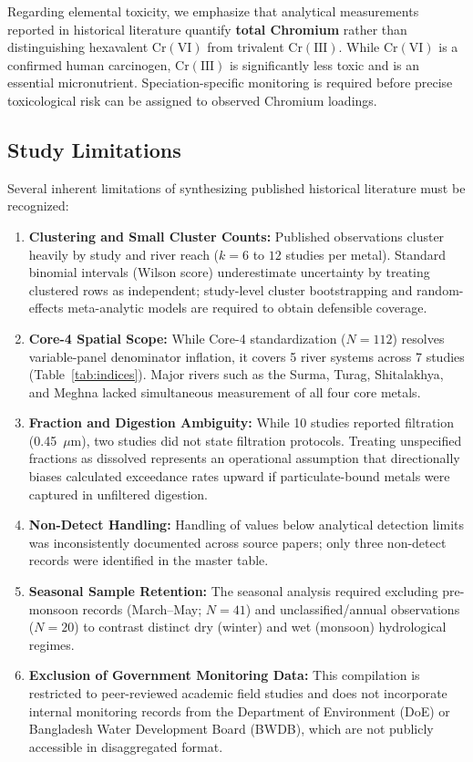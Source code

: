 \documentclass[authoryear,preprint,12pt]{elsarticle}
\begin{document}
Regarding elemental toxicity, we emphasize that analytical measurements reported in historical literature quantify \textbf{total Chromium} rather than distinguishing hexavalent $\mathrm{Cr(VI)}$ from trivalent $\mathrm{Cr(III)}$. While $\mathrm{Cr(VI)}$ is a confirmed human carcinogen, $\mathrm{Cr(III)}$ is significantly less toxic and is an essential micronutrient. Speciation-specific monitoring is required before precise toxicological risk can be assigned to observed Chromium loadings.

\subsection{Study Limitations}
Several inherent limitations of synthesizing published historical literature must be recognized:
\begin{enumerate}
    \item \textbf{Clustering and Small Cluster Counts:} Published observations cluster heavily by study and river reach ($k=6$ to $12$ studies per metal). Standard binomial intervals (Wilson score) underestimate uncertainty by treating clustered rows as independent; study-level cluster bootstrapping and random-effects meta-analytic models are required to obtain defensible coverage.
    \item \textbf{Core-4 Spatial Scope:} While Core-4 standardization ($N=112$) resolves variable-panel denominator inflation, it covers 5 river systems across 7 studies (Table~\ref{tab:indices}). Major rivers such as the Surma, Turag, Shitalakhya, and Meghna lacked simultaneous measurement of all four core metals.
    \item \textbf{Fraction and Digestion Ambiguity:} While 10 studies reported filtration (0.45~$\mu\text{m}$), two studies did not state filtration protocols. Treating unspecified fractions as dissolved represents an operational assumption that directionally biases calculated exceedance rates upward if particulate-bound metals were captured in unfiltered digestion.
    \item \textbf{Non-Detect Handling:} Handling of values below analytical detection limits was inconsistently documented across source papers; only three non-detect records were identified in the master table.
    \item \textbf{Seasonal Sample Retention:} The seasonal analysis required excluding pre-monsoon records (March--May; $N=41$) and unclassified/annual observations ($N=20$) to contrast distinct dry (winter) and wet (monsoon) hydrological regimes.
    \item \textbf{Exclusion of Government Monitoring Data:} This compilation is restricted to peer-reviewed academic field studies and does not incorporate internal monitoring records from the Department of Environment (DoE) or Bangladesh Water Development Board (BWDB), which are not publicly accessible in disaggregated format.
\end{enumerate}
\end{document}
